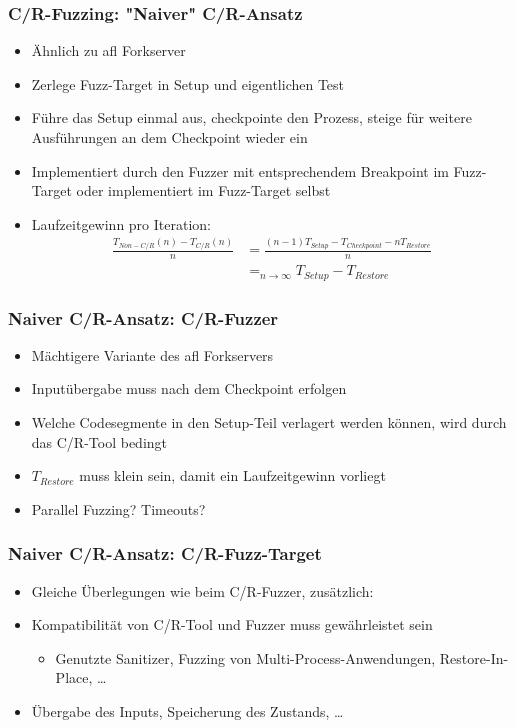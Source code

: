 \documentclass[handout]{beamer}
\begin{document}
\begin{frame}
    \frametitle{C/R-Fuzzing: "Naiver" C/R-Ansatz}
    \begin{itemize}
        \item Ähnlich zu afl Forkserver
        \item Zerlege Fuzz-Target in Setup und eigentlichen Test
        \item Führe das Setup einmal aus, checkpointe den Prozess, steige für weitere Ausführungen an dem Checkpoint wieder ein
        \item Implementiert durch den Fuzzer mit entsprechendem Breakpoint im Fuzz-Target oder implementiert im Fuzz-Target selbst
        \item Laufzeitgewinn pro Iteration:
            \begin{equation}
                \begin{split}
                    \frac{T_{Non-C/R}(n) - T_{C/R}(n)}{n} &= \frac{(n-1) T_{Setup} - T_{Checkpoint} - n T_{Restore}}{n} \\
                    &=_{n \to \infty} T_{Setup} - T_{Restore}
                \end{split}
            \end{equation}
    \end{itemize}
\end{frame}


\begin{frame}
    \frametitle{Naiver C/R-Ansatz: C/R-Fuzzer}
    \begin{itemize}
        \item Mächtigere Variante des afl Forkservers
        \item Inputübergabe muss nach dem Checkpoint erfolgen
        \item Welche Codesegmente in den Setup-Teil verlagert werden können, wird durch das C/R-Tool bedingt
        \item $T_{Restore}$ muss klein sein, damit ein Laufzeitgewinn vorliegt
        \item Parallel Fuzzing? Timeouts?
    \end{itemize}
\end{frame}

\begin{frame}
    \frametitle{Naiver C/R-Ansatz: C/R-Fuzz-Target}
    \begin{itemize}
        \item Gleiche Überlegungen wie beim C/R-Fuzzer, zusätzlich:
        \item Kompatibilität von C/R-Tool und Fuzzer muss gewährleistet sein
            \begin{itemize}
                \item Genutzte Sanitizer, Fuzzing von Multi-Process-Anwendungen, Restore-In-Place, \dots
            \end{itemize}
        \item Übergabe des Inputs, Speicherung des Zustands, \dots
    \end{itemize}
\end{frame}
\end{document}
